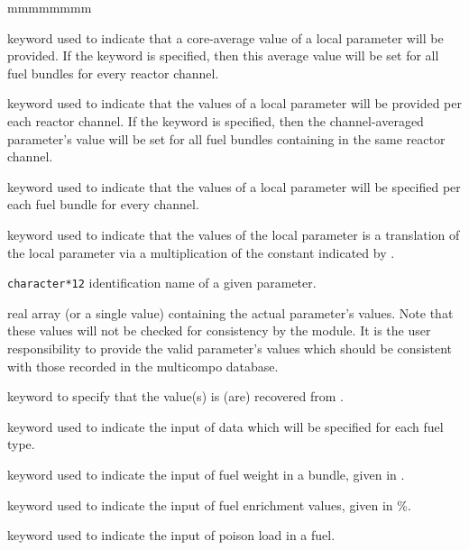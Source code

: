 \begin{ListeDeDescription}{mmmmmmmm}
\item[\moc{SAME}] keyword used to indicate that a core-average
value of a local parameter will be provided. If the keyword 
is specified, then this average value will be set for all fuel bundles for
every reactor channel.

\item[\moc{CHAN}] keyword used to indicate that the values of a local
parameter will be provided per each reactor channel. If the keyword 
is specified, then the channel-averaged parameter's value will be set for all fuel
bundles containing in the same reactor channel.

\item[\moc{BUND}] keyword used to indicate that the values of a local
parameter will be specified per each fuel bundle for every channel.

\item[\moc{TIMES}] keyword used to indicate that the values of the local
parameter  is a translation of the local parameter 
via a multiplication of the constant indicated by .

\item[\dusa{PNAMEREF}] \texttt{character*12} identification name of a given
parameter.

\item[\dusa{pvalue}] real array (or a single value) containing the actual
parameter's values. Note that these values will not be checked for consistency
by the module. It is the user responsibility to provide the valid parameter's values
which should be consistent with those recorded in the multicompo database.

\item[\moc{OLDMAP}] keyword to specify that the  value(s) is (are) recovered from . 

\item[\moc{FUEL}] keyword used to indicate the input of data which
will be specified for each fuel type.

\item[\moc{WEIGHT}] keyword used to indicate the input of fuel weight
in a bundle, given in .

\item[\moc{ENRICH}] keyword used to indicate the input of fuel enrichment
values, given in \%.

\item[\moc{POISON}] keyword used to indicate the input of poison load
in a fuel.


\end{ListeDeDescription}
